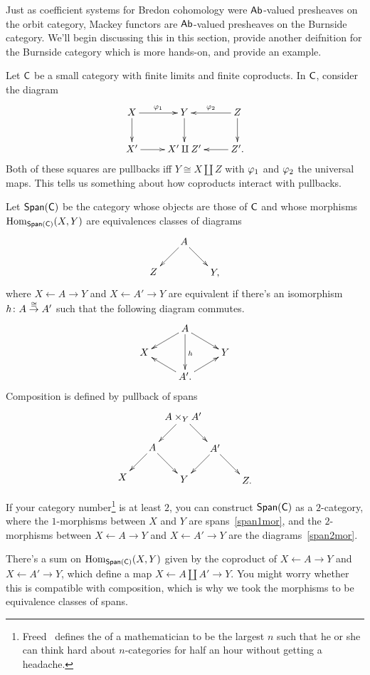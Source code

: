 Just as coefficient systems for Bredon cohomology were $\mathsf{Ab}$-valued presheaves on the orbit category, Mackey
functors are $\mathsf{Ab}$-valued presheaves on the Burnside category. We'll begin discussing this in this section, provide
another deifnition for the Burnside category which is more hands-on, and provide an example.

Let $\mathsf C$ be a small category with finite limits and finite coproducts. In $\mathsf C$, consider the diagram
\[\xymatrix{
	X\ar[r]^{\vp_1}\ar[d] & Y\ar[d] & Z\ar[d]\ar[l]_{\vp_2}\\
	X'\ar[r] & X'\amalg Z' & Z'.\ar[l]
}\]
Both of these squares are pullbacks iff $Y\cong X\amalg Z$ with $\varphi_1$ and $\varphi_2$ the universal maps. This tells
us something about how coproducts interact with pullbacks.
\begin{defn}
Let $\mathsf{Span}(\mathsf C)$ be the category whose objects are those of $\mathsf C$ and whose morphisms $\operatorname{Hom}_{\mathsf{Span}(\mathsf C)}(X,Y)$ are
equivalences classes of diagrams
\begin{equation}
\label{span1mor}
\gathxy[@dr]{
	A\ar[r]\ar[d] & Y,\\
	Z
}
\end{equation}
where $X\gets A\to Y$ and $X\gets A'\to Y$ are equivalent if there's an isomorphism $h\colon A\stackrel\cong\to A'$ such that
the following diagram commutes.
\begin{equation}
\label{span2mor}
\gathxy[@R=0.4cm]{
	& A\ar[dr]\ar[dl]\ar[dd]^h\\
	X && Y\\
	& A'.\ar[ul]\ar[ur]
}
\end{equation}
Composition is defined by pullback of spans
\[\xymatrix@dr{
	A\times_Y A'\ar[r]\ar[d] & A'\ar[r]\ar[d] & Z.\\
	A\ar[r]\ar[d] & Y\\
	X
}\]
\end{defn}
\begin{rem}
If your category number\footnote{Freed~\cite{CSRemarks} defines the  of a mathematician
to be the largest $n$ such that he or she can think hard about $n$-categories for half an hour without getting a
headache.} is at least $2$, you can construct $\mathsf{Span}(\mathsf C)$ as a $2$-category, where the $1$-morphisms between $X$
and $Y$ are spans~\eqref{span1mor}, and the $2$-morphisms between $X\gets A\to Y$ and $X\gets A'\to Y$ are the
diagrams~\eqref{span2mor}.
\end{rem}
There's a sum on $\operatorname{Hom}_{\mathsf{Span}(\mathsf C)}(X,Y)$ given by the coproduct of $X\gets A\to Y$ and $X\gets A'\to Y$, which
define a map $X\gets A\amalg A'\to Y$. You might worry whether this is compatible with composition, which is why
we took the morphisms to be equivalence classes of spans.

